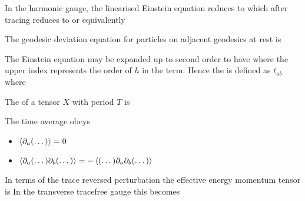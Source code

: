 \documentclass{article}
\begin{document}
\begin{lemma}
In the harmonic gauge, the linearised Einstein equation reduces to 
which after tracing reduces to 
or equivalently 
\end{lemma}

\begin{lemma}
The geodesic deviation equation for particles on adjacent geodesics at rest is 
\end{lemma}

\begin{definition}
The Einstein equation may be expanded up to second order to have 
where the upper index represents the order of $h$ in the term. Hence the  is defined as $t_{ab}$ where
\end{definition}



\begin{definition}
The  of a tensor $X$ with period $T$ is 
\end{definition}

\begin{lemma}
The time average obeys 
\begin{itemize}
    \item $\braket{\partial_a (\dots)} = 0 $
    \item $\braket{\partial_a(\dots)\partial_b(\dots)} = -\braket{(\dots)\partial_a\partial_b (\dots)}$
\end{itemize}
\end{lemma}

\begin{lemma}
In terms of the trace reversed perturbation the effective energy momentum tensor is 
In the transverse tracefree gauge this becomes 
\end{lemma}
\end{document}
